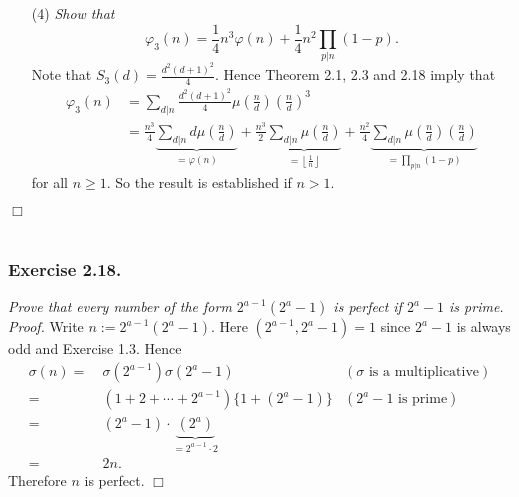 \documentclass{article}
\begin{document}
\begin{enumerate}
\item[(4)]
  \emph{Show that}
  \[
    \varphi_3(n) = \frac{1}{4}n^3 \varphi(n) + \frac{1}{4} n^2 \prod_{p|n}(1-p).
  \]
  Note that $S_3(d) = \frac{d^2(d+1)^2}{4}$.
  Hence Theorem 2.1, 2.3 and 2.18 imply that
  \begin{align*}
    \varphi_3(n)
    &= \sum_{d|n} \frac{d^2(d+1)^2}{4} \mu\left(\frac{n}{d}\right) \left(\frac{n}{d}\right)^3 \\
    &= \frac{n^3}{4} \underbrace{\sum_{d|n} d \mu\left(\frac{n}{d}\right)}_{= \varphi(n)}
        + \frac{n^3}{2}
            \underbrace{\sum_{d|n} \mu\left(\frac{n}{d}\right)}_{= \left\lfloor \frac{1}{n} \right\rfloor}
        + \frac{n^2}{4}
            \underbrace{\sum_{d|n} \mu\left(\frac{n}{d}\right)\left(\frac{n}{d}\right)}_{
                = \prod_{p|n}(1 - p)}
  \end{align*}
  for all $n \geq 1$.
  So the result is established if $n > 1$.
\end{enumerate}
$\Box$ \\\\









\subsubsection*{Exercise 2.18.}
\emph{Prove that every number of the form $2^{a-1}(2^a-1)$ is perfect
if $2^a-1$ is prime.} \\



\emph{Proof.}
  Write $n := 2^{a-1}(2^a-1)$.
  Here $(2^{a-1}, 2^a - 1) = 1$ since $2^a - 1$ is always odd and Exercise 1.3.
  Hence
  \begin{align*}
    \sigma(n)
    =& \: \sigma(2^{a-1}) \sigma(2^a-1)
      &(\text{$\sigma$ is a multiplicative}) \\
    =& \: (1 + 2 + \cdots + 2^{a-1})\{1 + (2^a-1)\}
      &(\text{$2^a - 1$ is prime}) \\
    =& \: (2^a - 1) \cdot \underbrace{(2^a)}_{= 2^{a-1} \cdot 2} \\
    =& \: 2n.
  \end{align*}
  Therefore $n$ is perfect.
$\Box$ \\\\
\end{document}
